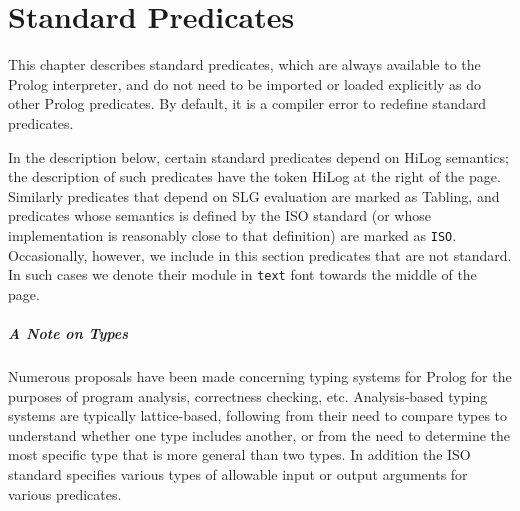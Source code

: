 \chapter{Standard Predicates} \label{standard}

This chapter describes standard predicates, which are always available
to the Prolog interpreter, and do not need to be imported or loaded
explicitly as do other Prolog predicates.  By default, it is a
compiler error to redefine standard predicates.  


In the description below, certain standard predicates depend on HiLog
semantics; the description of such predicates have the token {\sf
HiLog} at the right of the page.  Similarly predicates that depend on
SLG evaluation are marked as {\sf Tabling}, and predicates whose
semantics is defined by the ISO standard (or whose implementation is
reasonably close to that definition) are marked as {\tt ISO}.
Occasionally, however, we include in this section predicates that are
not standard.  In such cases we denote their module in {\tt text} font
towards the middle of the page.

\paragraph*{A Note on Types} \label{sec:types}

Numerous proposals have been made concerning typing systems for Prolog
for the purposes of program analysis, correctness checking, etc.
Analysis-based typing systems are typically lattice-based, following
from their need to compare types to understand whether one type
includes another, or from the need to determine the most specific type
that is more general than two types.  In addition the ISO standard
specifies various types of allowable input or output arguments for
various predicates.

